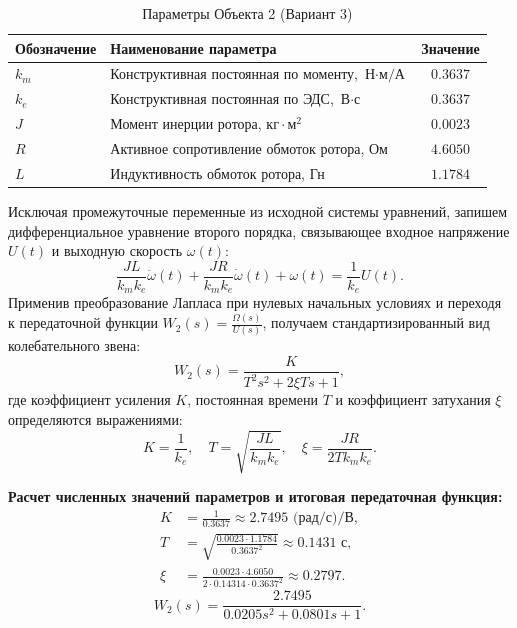\documentclass[12pt, a4paper]{article}
\begin{document}
\begin{table}[H]
\centering
\caption{Параметры Объекта 2 (Вариант 3)}
\label{tab:obj2_params}
\setlength{\tabcolsep}{10pt} 
\renewcommand{\arraystretch}{1.3} 
\begin{tabular}{@{} >{\raggedright\arraybackslash}p{3.5cm} >{\raggedright\arraybackslash}p{7.5cm} c @{}}
\toprule
\textbf{Обозначение} & \textbf{Наименование параметра} & \textbf{Значение} \\ \midrule
$k_m$ & Конструктивная постоянная по моменту, $\text{Н}\cdot\text{м/А}$ & $0.3637$ \\
$k_e$ & Конструктивная постоянная по ЭДС, $\text{В}\cdot\text{с}$ & $0.3637$ \\
$J$   & Момент инерции ротора, $\text{кг}\cdot\text{м}^2$ & $0.0023$ \\
$R$   & Активное сопротивление обмоток ротора, $\text{Ом}$ & $4.6050$ \\ 
$L$   & Индуктивность обмоток ротора, $\text{Гн}$ & $1.1784$ \\ \bottomrule
\end{tabular}
\end{table}


Исключая промежуточные переменные из исходной системы уравнений, запишем дифференциальное уравнение второго порядка, связывающее входное напряжение $U(t)$ и выходную скорость $\omega(t)$:
\begin{equation*}
    \frac{JL}{k_m k_e}\ddot{\omega}(t) + \frac{JR}{k_m k_e}\dot{\omega}(t) + \omega(t) = \frac{1}{k_e}U(t).
\end{equation*}
Применив преобразование Лапласа при нулевых начальных условиях и переходя к передаточной функции $W_2(s) = \frac{\Omega(s)}{U(s)}$, получаем стандартизированный вид колебательного звена:
\begin{equation}
    W_2(s) = \frac{K}{T^2s^2 + 2\xi Ts + 1},
\end{equation}
где коэффициент усиления $K$, постоянная времени $T$ и коэффициент затухания $\xi$ определяются выражениями:
\begin{equation*}
    K = \frac{1}{k_e}, \quad T = \sqrt{\frac{JL}{k_m k_e}}, \quad \xi = \frac{JR}{2T k_m k_e}.
\end{equation*}

\textbf{Расчет численных значений параметров и итоговая передаточная функция:}
\begin{align*}
    K &= \frac{1}{0.3637} \approx 2.7495 \text{ (рад/с)/В}, \\
    T &= \sqrt{\frac{0.0023 \cdot 1.1784}{0.3637^2}} \approx 0.1431 \text{ с}, \\
    \xi &= \frac{0.0023 \cdot 4.6050}{2 \cdot 0.14314 \cdot 0.3637^2}\approx 0.2797.
\end{align*}
\begin{equation}
    W_2(s) = \frac{2.7495}{0.0205s^2 + 0.0801s + 1}.
\end{equation}
\end{document}
